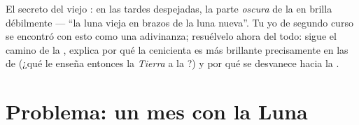 \begin{exercise}[$\star\star\star$]\label{exo:g7:moon-phases:12}
El secreto del viejo : en las tardes despejadas, la parte
\emph{oscura} de la  en  brilla débilmente --- ``la
luna vieja en brazos de la luna nueva''. Tu yo de segundo curso se
encontró con esto como una adivinanza; resuélvelo ahora del todo:
sigue el camino de la , explica por qué la  cenicienta es más
brillante precisamente en las  de  (¿qué
 le enseña entonces la \emph{Tierra} a la ?) y por qué
se desvanece hacia la .
\end{exercise}

\section{Problema: un mes con la Luna}

